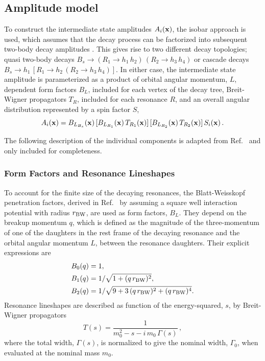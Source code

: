 \clearpage
\subsection{Amplitude model}
\label{ssec:ampModel}

To construct the intermediate state amplitudes $A_{i}(\mathbf{x} )$,
the isobar approach is used, which 
assumes that
the decay process can be factorized into subsequent two-body decay amplitudes \cite{isobar1,isobar,isobar2}.
This gives rise to two different decay topologies;
quasi two-body decays
$B_s \to (R_{1} \to h_{1}\,h_{2}) \, (R_{2} \to h_{3}\,h_{4})$ 
or cascade decays
$B_s \to h_{1} \, \left[R_{1} \to h_{2} \,  (R_{2} \to h_{3} \, h_{4}) \right]$.
In either case, the intermediate state amplitude is parameterized as a product of
orbital angular momentum, $L$, dependent 
form factors $B_{L}$, included for each vertex of the decay tree, 
Breit-Wigner propagators $T_{R}$,  included for each resonance $R$,
and an overall angular distribution represented by a spin factor $S$,
\begin{equation}
	A_{i}(\mathbf{x} ) =  B_{L_{B_s}}(\bold x) \, [B_{L_{R_{1}}}(\mathbf{x} )  \, T_{R_{1}}(\mathbf{x} )] \, [B_{L_{R_{2}}}(\mathbf{x} ) \, T_{R_{2}}(\mathbf{x} )]  \,  S_{i}(\mathbf{x} )  \, .
	\label{eq:amp4}
\end{equation}

The following description of the individual components is adapted from Ref.~\cite{dArgent:2017gzv} 
and only included for completeness.

\subsubsection{Form Factors and Resonance Lineshapes}
\label{ssec:lineshapes}

To account for the finite size of the decaying resonances,
the Blatt-Weisskopf penetration factors, 
derived in Ref.~\cite{Bl2}
by assuming a square well interaction potential with radius $r_{\rm BW}$,
are used as form factors, $B_L$.
They depend on
the breakup momentum $q$, which is defined as the magnitude of the three-momentum of one of the daughters in the rest frame of the decaying resonance
and the orbital angular momentum $L$, between the resonance daughters.
Their explicit expressions are
\begin{align}
         \nonumber
	B_{0}(q)  &= 1 ,  \\ \nonumber
	B_{1}(q)  &= 1 / \sqrt{{1+ (q \, r_{\rm BW})^{2}}} ,  \\
	B_{2}(q)  &= 1 / \sqrt{9+3\,(q \, r_{\rm BW})^{2}+(q \, r_{\rm BW})^{4}} . 
\end{align}
Resonance lineshapes
are described as function of the energy-squared, $s$, by Breit-Wigner propagators
\begin{equation}
	T(s) = \frac{1}
	{m_0^{2} - s - i\,m_{0}\,\Gamma(s)}   \, ,
	\label{eq:BW}
\end{equation}
where the total width, $\Gamma(s)$, is normalized to give the nominal width, $\Gamma_{0}$, when evaluated at the nominal mass $m_{0}$.

